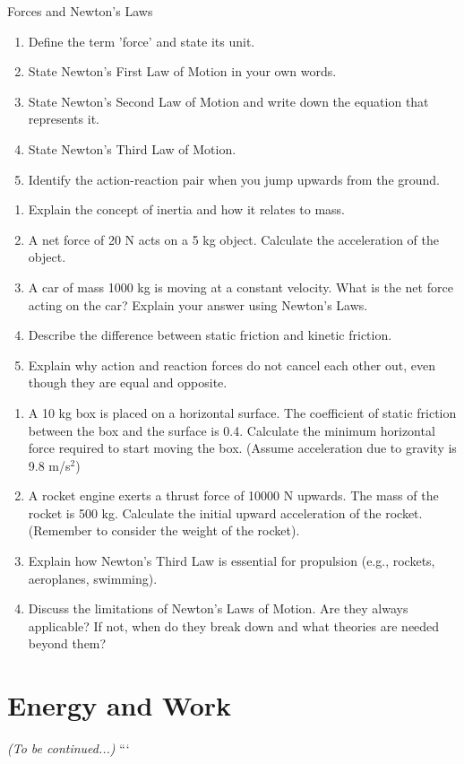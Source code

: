 \begin{tieredquestions}{Forces and Newton's Laws}

\begin{enumerate}[label=\textbf{Basic Questions}]
    \item Define the term 'force' and state its unit.
    \item State Newton's First Law of Motion in your own words.
    \item State Newton's Second Law of Motion and write down the equation that represents it.
    \item State Newton's Third Law of Motion.
    \item Identify the action-reaction pair when you jump upwards from the ground.
\end{enumerate}

\begin{enumerate}[resume, label=\textbf{Intermediate Questions}]
    \item Explain the concept of inertia and how it relates to mass.
    \item A net force of 20 N acts on a 5 kg object. Calculate the acceleration of the object.
    \item A car of mass 1000 kg is moving at a constant velocity. What is the net force acting on the car? Explain your answer using Newton's Laws.
    \item Describe the difference between static friction and kinetic friction.
    \item Explain why action and reaction forces do not cancel each other out, even though they are equal and opposite.
\end{enumerate}

\begin{enumerate}[resume, label=\textbf{Advanced Questions}]
    \item A 10 kg box is placed on a horizontal surface. The coefficient of static friction between the box and the surface is 0.4. Calculate the minimum horizontal force required to start moving the box. (Assume acceleration due to gravity is 9.8 m/s$^2$)
    \item A rocket engine exerts a thrust force of 10000 N upwards. The mass of the rocket is 500 kg. Calculate the initial upward acceleration of the rocket. (Remember to consider the weight of the rocket).
    \item Explain how Newton's Third Law is essential for propulsion (e.g., rockets, aeroplanes, swimming).
    \item Discuss the limitations of Newton's Laws of Motion. Are they always applicable? If not, when do they break down and what theories are needed beyond them?
\end{enumerate}

\end{tieredquestions}

\section{Energy and Work}

\textit{(To be continued...)}
```